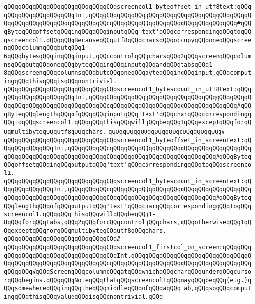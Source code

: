 \verb|qQQqqQQqqQQqqQQqqQQqqQQqqQQqqQQqscreencol1_byteoffset_in_utf8text:qQQqqQQqqQQqqQQqqQQqqQQqInt,qQQqqQQqqQQqqQQqqQQqqQQqqQQqqQQqqQQqqQQqqQQqqQQqqQQqqQQqqQQqqQQqqQQqqQQqqQQqqQQqqQQqqQQqqQQqqQQqqQQqqQQqqQQqqQQq#qQQqByteqQQqoffsetqQQqinqQQqqQQqinputqQQq'text'qQQqcorrespondingqQQqtoqQQqscreencol1.qQQqqQQqBecauseqQQqutf8qQQqcharsqQQqoccupyqQQqoneqQQqscreenqQQqcolumnqQQqbutqQQq1-6qQQqbytesqQQqinqQQqinput,qQQqcontrolqQQqcharsqQQq2qQQqscreenqQQqcolumnsqQQqbutqQQqoneqQQqbyteqQQqinqQQqinputqQQqandqQQqtabsqQQq1-8qQQqscreenqQQqcolumnsqQQqbutqQQqoneqQQqbyteqQQqinqQQqinput,qQQqcomputingqQQqthisqQQqisqQQqnontrivial.|\newline
\verb|qQQqqQQqqQQqqQQqqQQqqQQqqQQqqQQqscreencol1_bytescount_in_utf8text:qQQqqQQqqQQqqQQqqQQqqQQqInt,qQQqqQQqqQQqqQQqqQQqqQQqqQQqqQQqqQQqqQQqqQQqqQQqqQQqqQQqqQQqqQQqqQQqqQQqqQQqqQQqqQQqqQQqqQQqqQQqqQQqqQQqqQQqqQQq#qQQqByteqQQqlengthqQQqofqQQqqQQqinputqQQq'text'qQQqcharqQQqcorrespondingqQQqtoqQQqscreencol1.qQQqqQQqThisqQQqwillqQQqbeqQQq1qQQqexceptqQQqforqQQqmultibyteqQQqutf8qQQqchars.|\newline
\verb|qQQqqQQqqQQqqQQqqQQqqQQqqQQqqQQq#|\newline
\verb|qQQqqQQqqQQqqQQqqQQqqQQqqQQqqQQqscreencol1_byteoffset_in_screentext:qQQqqQQqqQQqqQQqInt,qQQqqQQqqQQqqQQqqQQqqQQqqQQqqQQqqQQqqQQqqQQqqQQqqQQqqQQqqQQqqQQqqQQqqQQqqQQqqQQqqQQqqQQqqQQqqQQqqQQqqQQqqQQqqQQq#qQQqByteqQQqoffsetqQQqinqQQqoutputqQQq'text'qQQqcorrespondingqQQqtoqQQqscreencol1.|\newline
\verb|qQQqqQQqqQQqqQQqqQQqqQQqqQQqqQQqscreencol1_bytescount_in_screentext:qQQqqQQqqQQqqQQqInt,qQQqqQQqqQQqqQQqqQQqqQQqqQQqqQQqqQQqqQQqqQQqqQQqqQQqqQQqqQQqqQQqqQQqqQQqqQQqqQQqqQQqqQQqqQQqqQQqqQQqqQQqqQQqqQQq#qQQqByteqQQqlengthqQQqofqQQqoutputqQQq'text'qQQqcharqQQqcorrespondingqQQqtoqQQqscreencol1.qQQqqQQqThisqQQqwillqQQqbeqQQq1-8qQQqforqQQqtabs,qQQq2qQQqforqQQqcontrolqQQqchars,qQQqotherwiseqQQq1qQQqexceptqQQqforqQQqmultibyteqQQqutf8qQQqchars.|\newline
\verb|qQQqqQQqqQQqqQQqqQQqqQQqqQQqqQQq#|\newline
\verb|qQQqqQQqqQQqqQQqqQQqqQQqqQQqqQQqscreencol1_firstcol_on_screen:qQQqqQQqqQQqqQQqqQQqqQQqqQQqqQQqqQQqqQQqInt,qQQqqQQqqQQqqQQqqQQqqQQqqQQqqQQqqQQqqQQqqQQqqQQqqQQqqQQqqQQqqQQqqQQqqQQqqQQqqQQqqQQqqQQqqQQqqQQqqQQqqQQqqQQqqQQq#qQQqScreenqQQqcolumnqQQqatqQQqwhichqQQqcharqQQqunderqQQqcursorqQQqbegins.qQQqqQQqNoteqQQqthatqQQqscreencol1qQQqmayqQQqbeqQQq(e.g.)qQQqsomewhereqQQqinqQQqtheqQQqmiddleqQQqofqQQqaqQQqtab,qQQqsoqQQqcomputingqQQqthisqQQqvalueqQQqisqQQqnontrivial.qQQq|\newline
